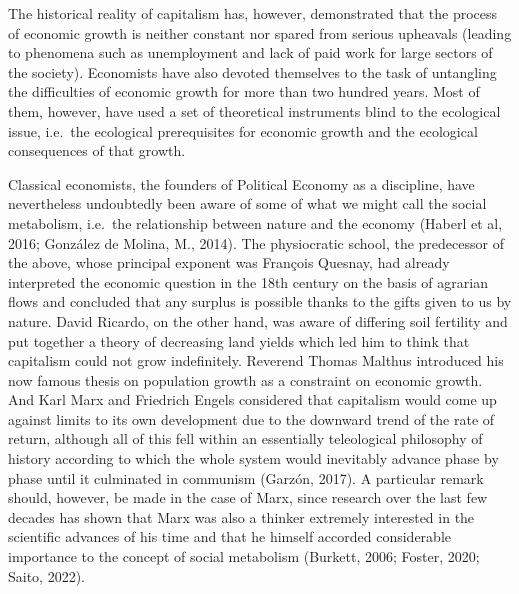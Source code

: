 \documentclass[
]{book}
\begin{document}
The historical reality of capitalism has, however, demonstrated that the process of economic growth is neither constant nor spared from serious upheavals (leading to phenomena such as unemployment and lack of paid work for large sectors of the society). Economists have also devoted themselves to the task of untangling the difficulties of economic growth for more than two hundred years. Most of them, however, have used a set of theoretical instruments blind to the ecological issue, i.e.~the ecological prerequisites for economic growth and the ecological consequences of that growth.

Classical economists, the founders of Political Economy as a discipline, have nevertheless undoubtedly been aware of some of what we might call the social metabolism, i.e.~the relationship between nature and the economy (Haberl et al, 2016; González de Molina, M., 2014). The physiocratic school, the predecessor of the above, whose principal exponent was François Quesnay, had already interpreted the economic question in the 18th century on the basis of agrarian flows and concluded that any surplus is possible thanks to the gifts given to us by nature. David Ricardo, on the other hand, was aware of differing soil fertility and put together a theory of decreasing land yields which led him to think that capitalism could not grow indefinitely. Reverend Thomas Malthus introduced his now famous thesis on population growth as a constraint on economic growth. And Karl Marx and Friedrich Engels considered that capitalism would come up against limits to its own development due to the downward trend of the rate of return, although all of this fell within an essentially teleological philosophy of history according to which the whole system would inevitably advance phase by phase until it culminated in communism (Garzón, 2017). A particular remark should, however, be made in the case of Marx, since research over the last few decades has shown that Marx was also a thinker extremely interested in the scientific advances of his time and that he himself accorded considerable importance to the concept of social metabolism (Burkett, 2006; Foster, 2020; Saito, 2022).
\end{document}
